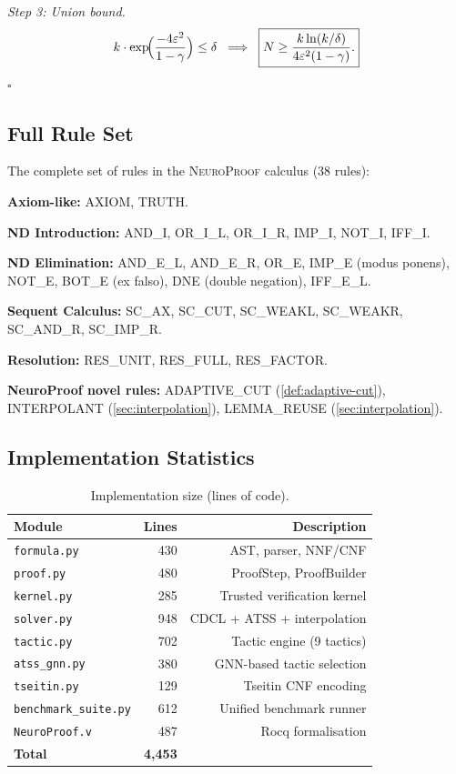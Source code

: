 \documentclass[conference]{IEEEtran}
\newcommand{\NP}{\textsc{NeuroProof}}
\begin{document}
\emph{Step 3: Union bound.}
\[
  k \cdot \exp\!\Bigl(\frac{-4\varepsilon^2}{1-\gamma}\Bigr)
  \leq \delta
  \;\;\Longrightarrow\;\;
  \boxed{N \geq
    \frac{k \ln(k/\delta)}{4\varepsilon^2(1-\gamma)}.}
\]
\hfill$\square$

\subsection{Full Rule Set}

The complete set of rules in the \NP{} calculus (38 rules):

\medskip
\textbf{Axiom-like:} AXIOM, TRUTH.

\textbf{ND Introduction:} AND\_I, OR\_I\_L, OR\_I\_R, IMP\_I,
NOT\_I, IFF\_I.

\textbf{ND Elimination:} AND\_E\_L, AND\_E\_R, OR\_E, IMP\_E
(modus ponens), NOT\_E, BOT\_E (ex falso), DNE (double negation),
IFF\_E\_L.

\textbf{Sequent Calculus:} SC\_AX, SC\_CUT, SC\_WEAKL, SC\_WEAKR,
SC\_AND\_R, SC\_IMP\_R.

\textbf{Resolution:} RES\_UNIT, RES\_FULL, RES\_FACTOR.

\textbf{NeuroProof novel rules:} ADAPTIVE\_CUT
(\cref{def:adaptive-cut}), INTERPOLANT (\cref{sec:interpolation}),
LEMMA\_REUSE (\cref{sec:interpolation}).

\subsection{Implementation Statistics}
\label{app:impl-stats}

\begin{table}[h]
  \centering
  \caption{Implementation size (lines of code).}
  \begin{tabular}{@{}lrr@{}}
    \toprule
    Module & Lines & Description \\
    \midrule
    \texttt{formula.py} & 430 & AST, parser, NNF/CNF \\
    \texttt{proof.py}   & 480 & ProofStep, ProofBuilder \\
    \texttt{kernel.py}  & 285 & Trusted verification kernel \\
    \texttt{solver.py}  & 948 & CDCL + ATSS + interpolation \\
    \texttt{tactic.py}  & 702 & Tactic engine (9 tactics) \\
    \texttt{atss\_gnn.py} & 380 & GNN-based tactic selection \\
    \texttt{tseitin.py} & 129 & Tseitin CNF encoding \\
    \texttt{benchmark\_suite.py} & 612 & Unified benchmark runner \\
    \texttt{NeuroProof.v} & 487 & Rocq formalisation \\
    \midrule
    \textbf{Total} & \textbf{4{,}453} & \\
    \bottomrule
  \end{tabular}
\end{table}
\end{document}
